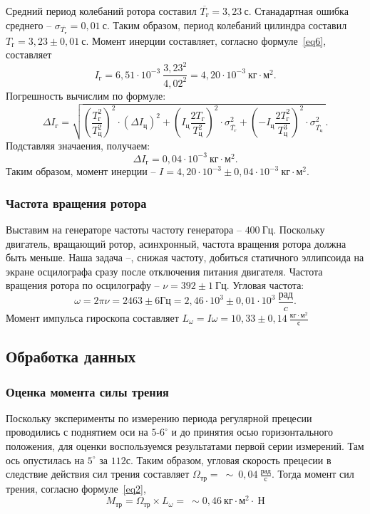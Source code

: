 \documentclass[a4paper,11pt]{article}
\begin{document}
Средний период колебаний ротора составил $\overline{T_{г}} = 3,23\ с$.\newline
Станадартная ошибка среднего -- $\sigma_{\overline{T_{г}}}= 0,01\ с$.\newline
Таким образом, период колебаний цилиндра составил $T_{г} = 3,23 \pm 0,01\ с$.\newline
Момент инерции составляет, согласно формуле~\ref{eq6}, составляет
$$I_{г} = 6,51 \cdot 10^{-3}\ \frac{3,23^{2}}{4,02^{2}} = 4,20 \cdot 10^{-3}\ кг \cdot м^{2}.$$
Погрешность вычислим по формуле:
$$\Delta I_{г} = \sqrt{\left(\frac{T_{г}^{2}}{T_{ц}^{2}}\right)^{2} \cdot \left(\Delta I_{ц}\right)^{2} + \left(I_{ц} \frac{2T_{г}}{T_{ц}^{2}}\right)^{2} \cdot \sigma_{\overline{T_{г}}}^{2} + \left(-I_{ц} \frac{2T_{г}^{2}}{T_{ц}^{3}}\right)^{2} \cdot \sigma_{\overline{T_{ц}}}^{2}\ }.$$
Подставляя значаения, получаем:
$$\Delta I_{г} = 0,04 \cdot 10^{-3}\ кг \cdot м^{2}.$$
Таким образом, момент инерции -- $I = 4,20 \cdot 10^{-3} \pm 0,04 \cdot 10^{-3}\ кг \cdot м^{2}.$
\subsubsection{Частота вращения ротора} %
Выставим на генераторе частоты частоту генератора -- $400\ Гц$. Поскольку двигатель, вращающий ротор, асинхронный, частота вращения ротора должна быть меньше. Наша задача --, снижая частоту, добиться статичного эллипсоида на экране осцилографа сразу после отключения питания двигателя.\newline
Частота вращения ротора по осцилографу -- $\nu = 392 \pm 1\ Гц$.\newline
Угловая частота:
$$\omega = 2 \pi \nu = 2463 \pm 6 Гц = 2,46 \cdot 10^{3} \pm 0,01 \cdot 10^{3}\ \frac{рад}{c}.$$
Момент импульса гироскопа составляет $L_{\omega} = I \omega = 10,33 \pm 0,14\ \frac{кг \cdot м^{2}}{с}$
\subsection{Обработка данных}
\subsubsection{Оценка момента силы трения} %
Поскольку эксперименты по измерению периода регулярной прецесии проводились с поднятием оси на $5$-$6^{\circ}$ и до принятия осью горизонтального положения, для оценки воспользуемся результатами первой серии измерений. Там ось опустилась на $5^{\circ}$ за $112 с$. Таким образом, угловая скорость прецесии в следствие действия сил трения составляет $\Omega_{тр} =\ \sim~0,04\ \frac{рад}{с}$. Тогда момент сил трения, согласно формуле~\ref{eq2},
$$M_{тр} = \Omega_{тр} \times L_{\omega} =\ \sim 0,46\ кг \cdot м^{2} \cdot\ Н$$
\end{document}
